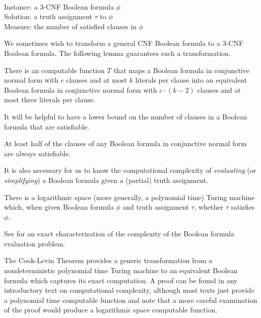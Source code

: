 \documentclass[]{article}
\newenvironment{instance}{\\Instance:}{}
\newenvironment{measure}{\\Measure:}{}
\newenvironment{solution}{\\Solution:}{}
\begin{document}
\begin{definition}
  \mbox{}
  \begin{instance}
    a 3-CNF Boolean formula $\phi$
  \end{instance}
  \begin{solution}
    a truth assignment $\tau$ to $\phi$
  \end{solution}
  \begin{measure}
    the number of satisfied clauses in $\phi$
  \end{measure}
\end{definition}

We sometimes wish to transform a general CNF Boolean formula to a 3-CNF Boolean formula.
The following lemma guarantees such a transformation.

\begin{lemma}\label{lem:three}
  There is an \NC{} computable function $T$ that maps a Boolean formula in conjunctive normal form with $c$ clauses and at most $k$ literals per clause into an equivalent Boolean formula in conjunctive normal form with $c \cdot (k - 2)$ clauses and at most three literals per clause.
\end{lemma}

It will be helpful to have a lower bound on the number of clauses in a Boolean formula that are satisfiable.

\begin{lemma}\label{lem:half}
 At least half of the clauses of any Boolean formula in conjunctive normal form are always satisfiable.
\end{lemma}

It is also necessary for us to know the computational complexity of \emph{evaluating} (or \emph{simplifying}) a Boolean formula given a (partial) truth assignment.

\begin{lemma}\label{lem:evaluation}
  There is a logarithmic space (more generally, a polynomial time) Turing machine which, when given Boolean formula $\phi$ and truth assignment $\tau$, whether $\tau$ satisfies $\phi$.
\end{lemma}

See \cite{buss87} for an exact characterization of the complexity of the Boolean formula evaluation problem.

The Cook-Levin Theorem provides a generic transformation from a nondeterministic polynomial time Turing machine to an equivalent Boolean formula which captures its exact computation.
A proof can be found in any introductory text on computational complexity, although most texts just provide a polynomial time computable function and note that a more careful examination of the proof would produce a logarithmic space computable function.
\end{document}
